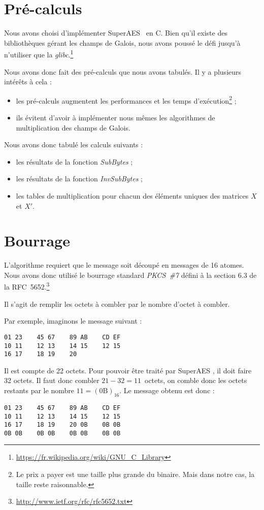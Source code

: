 \documentclass[12pt,a4paper]{report}
\begin{document}
\section{Pré-calculs}

Nous avons choisi d'implémenter \og SuperAES \fg\ en C. Bien qu'il existe des
bibliothèques gérant les champs de Galois, nous avons poussé le défi jusqu'à
n'utiliser que la
\emph{glibc}.\footnote{\url{https://fr.wikipedia.org/wiki/GNU_C_Library}}

Nous avons donc fait des pré-calculs que nous avons tabulés. Il y a plusieurs
intérêts à cela :

\begin{itemize}
\item les pré-calculs augmentent les performances et les temps
d'exécution\footnote{Le prix a payer est une taille plus grande
du binaire. Mais dans notre cas, la taille reste raisonnable.} ;

\item ils évitent d'avoir à implémenter nous mêmes les algorithmes
de multiplication des champs de Galois.
\end{itemize}

Nous avons donc tabulé les calculs suivants :
\begin{itemize}
\item les résultats de la fonction \emph{SubBytes} ;
\item les résultats de la fonction \emph{InvSubBytes} ;
\item les tables de multiplication pour chacun des éléments
uniques des matrices $X$ et $X'$.
\end{itemize}

\section{Bourrage}

L'algorithme requiert que le message soit découpé en messages de 16 atomes.
Nous avons donc utilisé le bourrage standard \emph{PKCS~\#7} défini à la
section 6.3 de la RFC~5652.\footnote{\url{http://www.ietf.org/rfc/rfc5652.txt}}

Il s'agit de remplir les octets à combler par le nombre d'octet à combler.

Par exemple, imaginons le message suivant :
\begin{verbatim}
01 23    45 67    89 AB    CD EF
10 11    12 13    14 15    12 15
16 17    18 19    20
\end{verbatim}
Il est compte de 22 octets. Pour pouvoir être traité par \og SuperAES \fg, il doit
faire 32 octets.
Il faut donc combler $21 - 32 = 11$~octets, on comble donc les octets restants
par le nombre $11 = (\mbox{0B})_{16}$. Le message obtenu est donc :
\begin{verbatim}
01 23    45 67    89 AB    CD EF
10 11    12 13    14 15    12 15
16 17    18 19    20 0B    0B 0B
0B 0B    0B 0B    0B 0B    0B 0B
\end{verbatim}
\end{document}
